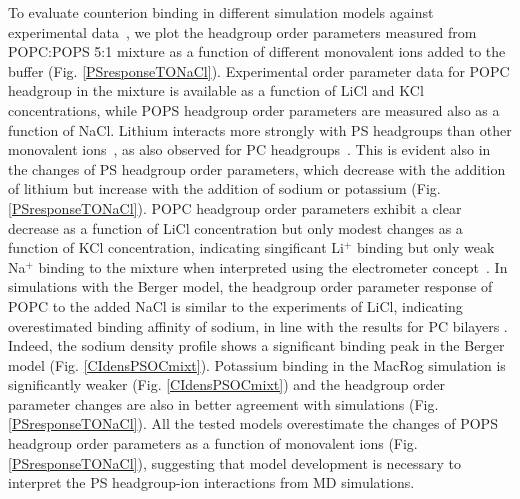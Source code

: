 \documentclass[aps,prl,superscriptaddress,twocolumn]{revtex4}
\begin{document}
To evaluate counterion binding in different simulation models against experimental data~\cite{roux90},
we plot the headgroup order parameters measured from POPC:POPS 5:1 mixture
as a function of different monovalent ions added to the buffer (Fig. \ref{PSresponseTONaCl}). 
Experimental order parameter data for POPC headgroup in the mixture is available as a function
of LiCl and KCl concentrations, while POPS headgroup order parameters are measured also
as a function of NaCl. Lithium interacts more strongly with PS headgroups than other monovalent 
ions~\cite{hauser83,hauser85,roux86,mattai89,roux90}, as also observed for PC headgroups~\cite{cevc90}. 
This is evident also in the changes of PS headgroup order parameters, which decrease with the addition of lithium 
but increase with the addition of sodium or potassium (Fig. \ref{PSresponseTONaCl}). 
POPC headgroup order parameters exhibit a clear decrease as a function of LiCl concentration
but only modest changes as a function of KCl concentration, indicating singificant 
Li$^+$ binding but only weak Na$^+$ binding to the mixture when interpreted using the
electrometer concept~\cite{akutsu81,altenbach84,seelig87}. In simulations with the
Berger model, the headgroup order parameter response of POPC
to the added NaCl is similar to the experiments of LiCl,
indicating overestimated binding affinity of sodium, in line with the results for PC bilayers \cite{catte16}.
Indeed, the sodium density profile shows a significant binding peak in the 
Berger model (Fig. \ref{CIdensPSOCmixt}). Potassium binding in the MacRog simulation
is significantly weaker  (Fig. \ref{CIdensPSOCmixt}) and the headgroup order parameter 
changes are also in better agreement with simulations (Fig. \ref{PSresponseTONaCl}).
All the tested models overestimate the changes of POPS headgroup order parameters as
a function of monovalent ions (Fig. \ref{PSresponseTONaCl}), suggesting that
model development is necessary to interpret the PS headgroup-ion interactions 
from MD simulations.
\end{document}
